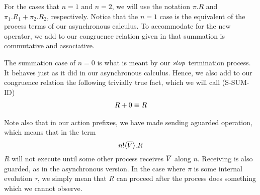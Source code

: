 For the cases that $n=1$ and $n=2$, we will use the notation $\pi.R$ and $\pi_1.R_1 + \pi_2.R_2$, respectively.  Notice that the $n=1$ case is the equivalent of the process terms of our asynchronous calculus.
To accommodate for the new operator, we add to our congruence relation given in  that summation is commutative and associative.

The summation case of $n=0$ is what is meant by our $\mbox{\emph{stop}}$ termination process.  It behaves just as it did in our asynchronous calculus.
Hence, we also add to our congruence relation the following trivially true fact, which we will call (S-SUM-ID)
\begin{align*}
	R + 0 \equiv R
\end{align*}

Note also that in our action prefixes, we have made sending aguarded operation, which means that in the term
\[
	{n}!\langle{ \ensuremath{\overline{V}} }\rangle.R
\]
$R$ will not execute until some other process receives $\overline{V}$ along $n$.  
Receiving is also guarded, as in the asynchronous version.  
In the case where $\pi$ is some internal evolution $\tau$, we simply mean that $R$ can proceed after the process does something which we cannot observe.  



